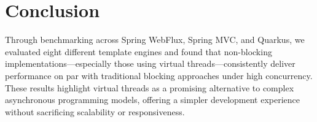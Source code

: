 \section{Conclusion}

Through benchmarking across Spring WebFlux, Spring MVC, and Quarkus, we
evaluated eight different template engines and found that non-blocking
implementations—especially those using virtual threads—consistently deliver
performance on par with traditional blocking approaches under high concurrency.
These results highlight virtual threads as a promising alternative to complex
asynchronous programming models, offering a simpler development experience
without sacrificing scalability or responsiveness.

\pagebreak